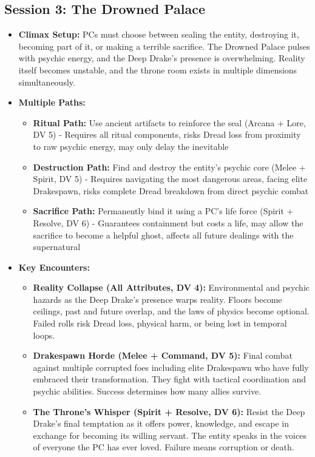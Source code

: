 \documentclass[11pt]{article}
\begin{document}
\subsection{Session 3: The Drowned Palace}
\begin{itemize}
\item \textbf{Climax Setup:} PCs must choose between sealing the entity, destroying it, becoming part of it, or making a terrible sacrifice. The Drowned Palace pulses with psychic energy, and the Deep Drake's presence is overwhelming. Reality itself becomes unstable, and the throne room exists in multiple dimensions simultaneously.
\item \textbf{Multiple Paths:}
  \begin{itemize}
  \item \textbf{Ritual Path:} Use ancient artifacts to reinforce the seal (Arcana + Lore, DV 5) - Requires all ritual components, risks Dread loss from proximity to raw psychic energy, may only delay the inevitable
  \item \textbf{Destruction Path:} Find and destroy the entity's psychic core (Melee + Spirit, DV 5) - Requires navigating the most dangerous areas, facing elite Drakespawn, risks complete Dread breakdown from direct psychic combat
  \item \textbf{Sacrifice Path:} Permanently bind it using a PC's life force (Spirit + Resolve, DV 6) - Guarantees containment but costs a life, may allow the sacrifice to become a helpful ghost, affects all future dealings with the supernatural
  \end{itemize}
\item \textbf{Key Encounters:}
  \begin{itemize}
  \item \textbf{Reality Collapse (All Attributes, DV 4):} Environmental and psychic hazards as the Deep Drake's presence warps reality. Floors become ceilings, past and future overlap, and the laws of physics become optional. Failed rolls risk Dread loss, physical harm, or being lost in temporal loops.
  \item \textbf{Drakespawn Horde (Melee + Command, DV 5):} Final combat against multiple corrupted foes including elite Drakespawn who have fully embraced their transformation. They fight with tactical coordination and psychic abilities. Success determines how many allies survive.
  \item \textbf{The Throne's Whisper (Spirit + Resolve, DV 6):} Resist the Deep Drake's final temptation as it offers power, knowledge, and escape in exchange for becoming its willing servant. The entity speaks in the voices of everyone the PC has ever loved. Failure means corruption or death.

\end{itemize}
\end{itemize}
\end{document}
